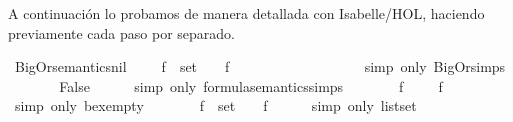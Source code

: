 \begin{isabellebody}
\begin{isamarkuptext}
  A continuación lo probamos de manera detallada con Isabelle/HOL, 
  haciendo previamente cada paso por separado.%
\end{isamarkuptext}\isamarkuptrue%
\isamarkupfalse%
\ BigOr{\isacharunderscore}semantics{\isacharunderscore}nil{\isacharcolon}\ {\isachardoublequoteopen}{\isacharparenleft}{\isasymA}\ {\isasymTurnstile}\ \isactrlbold {\isasymOr}{\isacharbrackleft}{\isacharbrackright}{\isacharparenright}\ {\isasymlongleftrightarrow}\ {\isacharparenleft}{\isasymexists}f\ {\isasymin}\ set\ {\isacharbrackleft}{\isacharbrackright}{\isachardot}\ {\isasymA}\ {\isasymTurnstile}\ f{\isacharparenright}{\isachardoublequoteclose}\ \isanewline
%
\isadelimproof
%
\endisadelimproof
%
\isatagproof
{}\isamarkupfalse%
\ {\isacharminus}\isanewline
\ \ \isamarkupfalse%
\ {\isachardoublequoteopen}{\isacharparenleft}{\isasymA}\ {\isasymTurnstile}\ \isactrlbold {\isasymOr}{\isacharbrackleft}{\isacharbrackright}{\isacharparenright}\ {\isacharequal}\ {\isasymA}\ {\isasymTurnstile}\ {\isasymbottom}{\isachardoublequoteclose}\isanewline
\ \ \ \ \isamarkupfalse%
\ {\isacharparenleft}simp\ only{\isacharcolon}\ BigOr{\isachardot}simps{\isacharparenleft}{}{\isacharparenright}{\isacharparenright}\isanewline
\ \ \isamarkupfalse%
\ \isamarkupfalse%
\ {\isachardoublequoteopen}{\isasymdots}\ {\isacharequal}\ False{\isachardoublequoteclose}\isanewline
\ \ \ \ \isamarkupfalse%
\ {\isacharparenleft}simp\ only{\isacharcolon}\ formula{\isacharunderscore}semantics{\isachardot}simps{\isacharparenleft}{}{\isacharparenright}{\isacharparenright}\isanewline
\ \ \isamarkupfalse%
\ \isamarkupfalse%
\ {\isachardoublequoteopen}{\isasymdots}\ {\isacharequal}\ {\isacharparenleft}{\isasymexists}f\ {\isasymin}\ {\isasymemptyset}{\isachardot}\ {\isasymA}\ {\isasymTurnstile}\ f{\isacharparenright}{\isachardoublequoteclose}\isanewline
\ \ \ \ \isamarkupfalse%
\ {\isacharparenleft}simp\ only{\isacharcolon}\ bex{\isacharunderscore}empty{\isacharparenright}\isanewline
\ \ \isamarkupfalse%
\ \isamarkupfalse%
\ {\isachardoublequoteopen}{\isasymdots}\ {\isacharequal}\ {\isacharparenleft}{\isasymexists}f\ {\isasymin}\ set\ {\isacharbrackleft}{\isacharbrackright}{\isachardot}\ {\isasymA}\ {\isasymTurnstile}\ f{\isacharparenright}{\isachardoublequoteclose}\isanewline
\ \ \ \ \isamarkupfalse%
\ {\isacharparenleft}simp\ only{\isacharcolon}\ list{\isachardot}set{\isacharparenright}\isanewline

\end{isabellebody}
